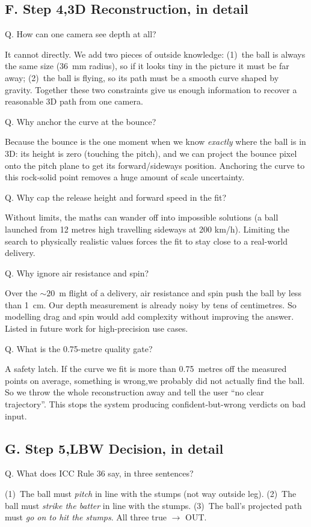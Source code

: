 \documentclass[11pt,a4paper]{article}
\newcommand{\qa}[2]{%
  \par\vspace{8pt}%
  \noindent
  \colorbox{NavyTint}{%
    \begin{minipage}{\dimexpr\textwidth-2\fboxsep\relax}%
      \color{white}\bfseries\strut Q. #1%
    \end{minipage}%
  }\par\nobreak
  \noindent
  \colorbox{MutedBg}{%
    \begin{minipage}{\dimexpr\textwidth-2\fboxsep\relax}%
      \color{black}\setlength{\parskip}{4pt}\strut #2\strut%
    \end{minipage}%
  }%
  \par\vspace{6pt}%
}
\begin{document}
\subsection{F. Step 4,3D Reconstruction, in detail}

\qa{How can one camera see depth at all?}{%
It cannot directly. We add two pieces of outside knowledge: (1)~the ball is always the same size (36~mm radius), so if it looks tiny in the picture it must be far away; (2)~the ball is flying, so its path must be a smooth curve shaped by gravity. Together these two constraints give us enough information to recover a reasonable 3D path from one camera.}

\qa{Why anchor the curve at the bounce?}{%
Because the bounce is the one moment when we know \emph{exactly} where the ball is in 3D: its height is zero (touching the pitch), and we can project the bounce pixel onto the pitch plane to get its forward/sideways position. Anchoring the curve to this rock-solid point removes a huge amount of scale uncertainty.}

\qa{Why cap the release height and forward speed in the fit?}{%
Without limits, the maths can wander off into impossible solutions (a ball launched from 12 metres high travelling sideways at 200 km/h). Limiting the search to physically realistic values forces the fit to stay close to a real-world delivery.}

\qa{Why ignore air resistance and spin?}{%
Over the ${\sim}20$~m flight of a delivery, air resistance and spin push the ball by less than 1~cm. Our depth measurement is already noisy by tens of centimetres. So modelling drag and spin would add complexity without improving the answer. Listed in future work for high-precision use cases.}

\qa{What is the 0.75-metre quality gate?}{%
A safety latch. If the curve we fit is more than 0.75~metres off the measured points on average, something is wrong,we probably did not actually find the ball. So we throw the whole reconstruction away and tell the user ``no clear trajectory''. This stops the system producing confident-but-wrong verdicts on bad input.}

\subsection{G. Step 5,LBW Decision, in detail}

\qa{What does ICC Rule 36 say, in three sentences?}{%
(1)~The ball must \emph{pitch} in line with the stumps (not way outside leg). (2)~The ball must \emph{strike the batter} in line with the stumps. (3)~The ball's projected path must \emph{go on to hit the stumps}. All three true $\rightarrow$ OUT.}
\end{document}
